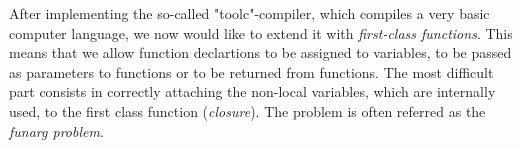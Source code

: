 After implementing the so-called "toolc"-compiler, which compiles a very basic computer language, we now would like to extend it with \emph{first-class functions}. This means that we allow function declartions to be assigned to variables, to be passed as parameters to functions or to be returned from functions.
The most difficult part consists in correctly attaching the non-local variables, which are internally used, to the first class function (\emph{closure}). The problem is often referred as the \emph{funarg problem}.
